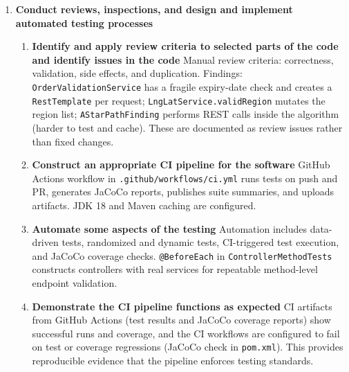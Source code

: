 \documentclass{article}
\begin{document}
\begin{enumerate}
\begin{enumerate}
\item \textbf{Discussing how the testing carried out compares with the target levels}
Line (86.3\%) and branch (93.3\%) meet targets. The 60s timeout is satisfied in all current runs, but sampling remains limited. With roughly 20 random path samples and no observed failures, the rule-of-three gives an upper bound of about 15\% failure rate at 95\% confidence, which is too weak for safety claims. HTTP-level coverage is 0\% (only method-level controller tests exist), so endpoint serialization and error responses are unverified.

\item \textbf{Discussion of what would be necessary to achieve the target level}
Add MockMvc tests for HTTP endpoints, mock external REST APIs, increase random path samples, and introduce mutation testing (PIT). Add performance baselines and concurrency tests to support stronger statistical claims.
\end{enumerate}

\item \textbf{Conduct reviews, inspections, and design and implement automated testing processes} \marginpar{[default 20\%]}
\begin{enumerate}
\item \textbf{Identify and apply review criteria to selected parts of the code and identify issues in the code}
Manual review criteria: correctness, validation, side effects, and duplication. Findings: \texttt{OrderValidationService} has a fragile expiry-date check and creates a \texttt{RestTemplate} per request; \texttt{LngLatService.validRegion} mutates the region list; \texttt{AStarPathFinding} performs REST calls inside the algorithm (harder to test and cache). These are documented as review issues rather than fixed changes.

\item \textbf{Construct an appropriate CI pipeline for the software}
GitHub Actions workflow in \texttt{.github/workflows/ci.yml} runs tests on push and PR, generates JaCoCo reports, publishes suite summaries, and uploads artifacts. JDK 18 and Maven caching are configured.

\item\textbf{Automate some aspects of the testing}
Automation includes data-driven tests, randomized and dynamic tests, CI-triggered test execution, and JaCoCo coverage checks. \texttt{@BeforeEach} in \texttt{ControllerMethodTests} constructs controllers with real services for repeatable method-level endpoint validation.

\item \textbf{Demonstrate the CI pipeline functions as expected}
CI artifacts from GitHub Actions (test results and JaCoCo coverage reports) show successful runs and coverage, and the CI workflows are configured to fail on test or coverage regressions (JaCoCo check in \texttt{pom.xml}). This provides reproducible evidence that the pipeline enforces testing standards.
\end{enumerate}
\end{enumerate}
\end{document}
